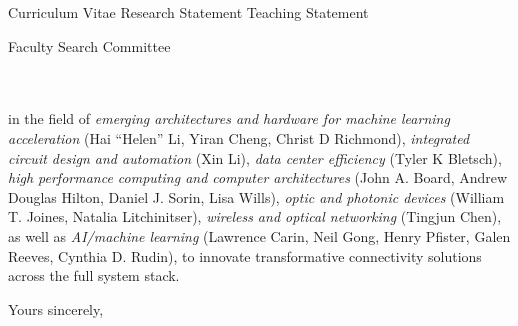 



\addAttach%
{Curriculum Vitae}%
{Research Statement}%
{Teaching Statement}
\def\appSpecific{with significant implications for the broad area of computer engineering}
\def\letterCustom{%
    in the field of \emph{emerging architectures and hardware for machine learning acceleration} (Hai ``Helen'' Li, Yiran Cheng, Christ D Richmond), \emph{integrated circuit design and automation} (Xin Li), \emph{data center efficiency} (Tyler K Bletsch), \emph{high performance computing and computer architectures} (John A. Board, Andrew Douglas Hilton, Daniel J. Sorin, Lisa Wills), \emph{optic and photonic devices} (William T. Joines, Natalia Litchinitser), \emph{wireless and optical networking} (Tingjun Chen), as well as \emph{AI/machine learning} (Lawrence Carin, Neil Gong, Henry Pfister, Galen Reeves, Cynthia D. Rudin), to innovate transformative connectivity solutions across the full system stack.%
}

\def\appJobID{%
    \ifthenelse{\equal{\jobID}{}}{\unskip}{\unskip\textemdash Job \# \jobID{}}%
}
\def\toAddr{%
Faculty Search Committee \\ \appDept{} \\ \appSchool{} \\ \appAddr{}%
}

\begin{letter}{\toAddr{}}
    \opening{\myOpening{}}
    
    \letterCustom{}
    
    \closing{Yours sincerely,}
    \encl{\listAttach{}}
\end{letter}
